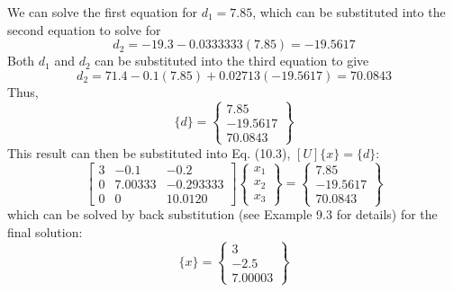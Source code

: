 \documentclass[../main.tex]{subfiles}
\begin{document}
We can solve the first equation for $d_{1} = 7.85$, which can be substituted into the second equation to solve for
\begin{equation}
d_{2} = -19.3 - 0.0333333(7.85) = -19.5617
\end{equation}
Both $d_{1}$ and $d_{2}$ can be substituted into the third equation to give
\begin{equation}
d_{2} = 71.4 - 0.1(7.85) + 0.02713(-19.5617) = 70.0843
\end{equation}
Thus,
\begin{equation}
\{d\}=
\begin{Bmatrix}
7.85\\
-19.5617\\
70.0843
\end{Bmatrix}
\end{equation}
This result can then be substituted into Eq. (10.3), $[U]\{x\}=\{d\}$:
\begin{equation}
\begin{bmatrix}
3 & -0.1 & -0.2 \\ 
0 & 7.00333 & -0.293333 \\ 
0 & 0 & 10.0120
\end{bmatrix}
\begin{Bmatrix}
x_{1}\\ 
x_{2}\\ 
x_{3}
\end{Bmatrix}
=
\begin{Bmatrix}
7.85\\ 
-19.5617\\ 
70.0843
\end{Bmatrix}
\end{equation}
which can be solved by back substitution (see Example 9.3 for details) for the final solution:
\begin{equation}
\{x\}=
\begin{Bmatrix}
3\\
-2.5\\
7.00003
\end{Bmatrix}
\end{equation}
\end{document}
